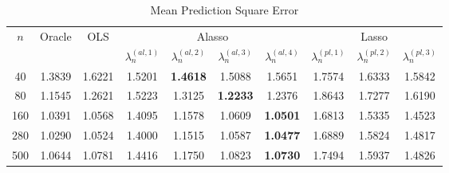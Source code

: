 \documentclass[12pt,a4paper]{article}
\begin{document}
\begin{table}[]\center \small
\caption{Mean Prediction Square Error}
\label{tab:1}
\small
\begin{tabular}{cccccccccc}
\hline
\multicolumn{1}{|c|}{\multirow{2}{*}{$ n $}} & \multirow{2}{*}{Oracle} & \multicolumn{1}{c|}{\multirow{2}{*}{OLS}} & \multicolumn{4}{c|}{Alasso}                                                                                                & \multicolumn{3}{c|}{Lasso}                                                                       \\
\multicolumn{1}{|c|}{}                       &                         & \multicolumn{1}{c|}{}                     & $ \lambda_n^{(al, 1)} $ & $ \lambda_n^{(al, 2)} $ & $ \lambda_n^{(al, 3)} $ & \multicolumn{1}{c|}{$ \lambda_n^{(al, 4)} $} & $ \lambda_n^{(pl, 1)} $ & $ \lambda_n^{(pl, 2)} $ & \multicolumn{1}{c|}{$ \lambda_n^{(pl, 3)} $} \\ \hline
\multicolumn{1}{|c|}{40}                     & 1.3839                  & \multicolumn{1}{c|}{1.6221}               & 1.5201                  & \textbf{1.4618}         & 1.5088                  & \multicolumn{1}{c|}{1.5651}                  & 1.7574                  & 1.6333                  & \multicolumn{1}{c|}{1.5842}                  \\
\multicolumn{1}{|c|}{80}                     & 1.1545                  & \multicolumn{1}{c|}{1.2621}               & 1.5223                  & 1.3125                  & \textbf{1.2233}         & \multicolumn{1}{c|}{1.2376}                  & 1.8643                  & 1.7277                  & \multicolumn{1}{c|}{1.6190}                  \\
\multicolumn{1}{|c|}{160}                    & 1.0391                  & \multicolumn{1}{c|}{1.0568}               & 1.4095                  & 1.1578                  & 1.0609                  & \multicolumn{1}{c|}{\textbf{1.0501}}         & 1.6813                  & 1.5335                  & \multicolumn{1}{c|}{1.4523}                  \\
\multicolumn{1}{|c|}{280}                    & 1.0290                  & \multicolumn{1}{c|}{1.0524}               & 1.4000                  & 1.1515                  & 1.0587                  & \multicolumn{1}{c|}{\textbf{1.0477}}         & 1.6889                  & 1.5824                  & \multicolumn{1}{c|}{1.4817}                  \\
\multicolumn{1}{|c|}{500}                    & 1.0644                  & \multicolumn{1}{c|}{1.0781}               & 1.4416                  & 1.1750                  & 1.0823                  & \multicolumn{1}{c|}{\textbf{1.0730}}         & 1.7494                  & 1.5937                  & \multicolumn{1}{c|}{1.4826}                  \\

\end{tabular}
\end{table}
\end{document}
